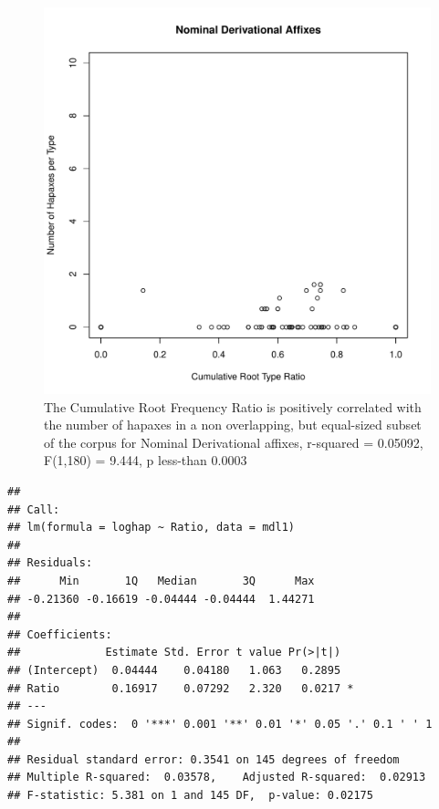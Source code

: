 \documentclass[12pt]{article}\usepackage[]{graphicx}\usepackage[]{color}
\makeatletter
\def\maxwidth{ %
  \ifdim\Gin@nat@width>\linewidth
    \linewidth
  \else
    \Gin@nat@width
  \fi
}
\newenvironment{kframe}{%
 \def\at@end@of@kframe{}%
 \ifinner\ifhmode%
  \def\at@end@of@kframe{\end{minipage}}%
  \begin{minipage}{\columnwidth}%
 \fi\fi%
 \def\FrameCommand##1{\hskip\@totalleftmargin \hskip-\fboxsep
 \colorbox{shadecolor}{##1}\hskip-\fboxsep
     \hskip-\linewidth \hskip-\@totalleftmargin \hskip\columnwidth}%
 \MakeFramed {\advance\hsize-\width
   \@totalleftmargin\z@ \linewidth\hsize
   \@setminipage}}%
 {\par\unskip\endMakeFramed%
 \at@end@of@kframe}
\newenvironment{knitrout}{}{} %
\makeatother
\begin{document}
\begin{knitrout}
\color{fgcolor}\begin{figure}
\includegraphics[width=\maxwidth]{figure/HapaxDataNomDerivation2-1} \caption[The Cumulative Root Frequency Ratio is positively correlated with the number of hapaxes in a non overlapping, but equal-sized subset of the corpus for Nominal Derivational affixes, r-squared = 0.05092, F(1,180) = 9.444, p less-than 0.0003]{The Cumulative Root Frequency Ratio is positively correlated with the number of hapaxes in a non overlapping, but equal-sized subset of the corpus for Nominal Derivational affixes, r-squared = 0.05092, F(1,180) = 9.444, p less-than 0.0003}\label{fig:HapaxDataNomDerivation2}
\end{figure}

\begin{kframe}\begin{verbatim}
## 
## Call:
## lm(formula = loghap ~ Ratio, data = mdl1)
## 
## Residuals:
##      Min       1Q   Median       3Q      Max 
## -0.21360 -0.16619 -0.04444 -0.04444  1.44271 
## 
## Coefficients:
##             Estimate Std. Error t value Pr(>|t|)  
## (Intercept)  0.04444    0.04180   1.063   0.2895  
## Ratio        0.16917    0.07292   2.320   0.0217 *
## ---
## Signif. codes:  0 '***' 0.001 '**' 0.01 '*' 0.05 '.' 0.1 ' ' 1
## 
## Residual standard error: 0.3541 on 145 degrees of freedom
## Multiple R-squared:  0.03578,	Adjusted R-squared:  0.02913 
## F-statistic: 5.381 on 1 and 145 DF,  p-value: 0.02175
\end{verbatim}
\end{kframe}
\end{knitrout}
\end{document}
